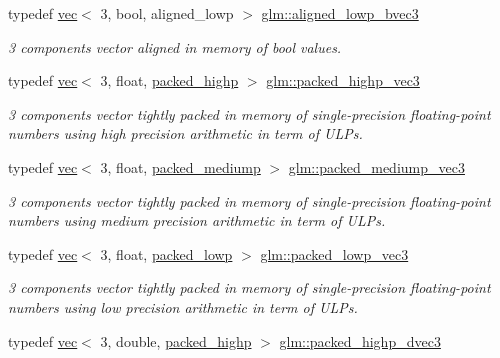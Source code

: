 \begin{DoxyCompactItemize}
typedef \mbox{\hyperlink{structglm_1_1vec}{vec}}$<$ 3, bool, aligned\+\_\+lowp $>$ \mbox{\hyperlink{group__gtc__type__aligned_ga83e413f4dd427d7b3fcbb531fce722be}{glm\+::aligned\+\_\+lowp\+\_\+bvec3}}
\begin{DoxyCompactList}\small\item\em 3 components vector aligned in memory of bool values. \end{DoxyCompactList}\item 
typedef \mbox{\hyperlink{structglm_1_1vec}{vec}}$<$ 3, float, \mbox{\hyperlink{namespaceglm_a36ed105b07c7746804d7fdc7cc90ff25a8e8791ee77fe079b1291f710d88031bf}{packed\+\_\+highp}} $>$ \mbox{\hyperlink{group__gtc__type__aligned_ga6814dd861e658e724ce9e5e673a4486b}{glm\+::packed\+\_\+highp\+\_\+vec3}}
\begin{DoxyCompactList}\small\item\em 3 components vector tightly packed in memory of single-\/precision floating-\/point numbers using high precision arithmetic in term of U\+L\+Ps. \end{DoxyCompactList}\item 
typedef \mbox{\hyperlink{structglm_1_1vec}{vec}}$<$ 3, float, \mbox{\hyperlink{namespaceglm_a36ed105b07c7746804d7fdc7cc90ff25a9604654c3b137cd7898689fd34b25bc0}{packed\+\_\+mediump}} $>$ \mbox{\hyperlink{group__gtc__type__aligned_ga34ad82503f637918457284618bef3a82}{glm\+::packed\+\_\+mediump\+\_\+vec3}}
\begin{DoxyCompactList}\small\item\em 3 components vector tightly packed in memory of single-\/precision floating-\/point numbers using medium precision arithmetic in term of U\+L\+Ps. \end{DoxyCompactList}\item 
typedef \mbox{\hyperlink{structglm_1_1vec}{vec}}$<$ 3, float, \mbox{\hyperlink{namespaceglm_a36ed105b07c7746804d7fdc7cc90ff25ac36a4bd74559be2c0b65bc48e5953b8b}{packed\+\_\+lowp}} $>$ \mbox{\hyperlink{group__gtc__type__aligned_ga64f20313965454ec7bd89f62ea4946ba}{glm\+::packed\+\_\+lowp\+\_\+vec3}}
\begin{DoxyCompactList}\small\item\em 3 components vector tightly packed in memory of single-\/precision floating-\/point numbers using low precision arithmetic in term of U\+L\+Ps. \end{DoxyCompactList}\item 
typedef \mbox{\hyperlink{structglm_1_1vec}{vec}}$<$ 3, double, \mbox{\hyperlink{namespaceglm_a36ed105b07c7746804d7fdc7cc90ff25a8e8791ee77fe079b1291f710d88031bf}{packed\+\_\+highp}} $>$ \mbox{\hyperlink{group__gtc__type__aligned_ga46950596525c0d1983113ead5f676651}{glm\+::packed\+\_\+highp\+\_\+dvec3}}

\end{DoxyCompactItemize}
